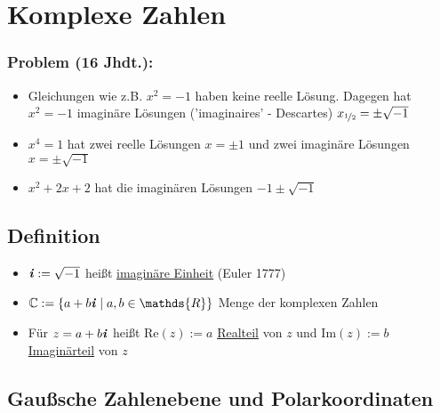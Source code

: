 \documentclass[12pt,titlepage, pdf]{article}
\newcommand{\R}{\mathds{R}}
\newcommand{\uline}[1]{\underline{#1}}
\renewcommand{\Re}[1]{\text{Re}(#1)}
\renewcommand{\Im}[1]{\text{Im}(#1)}
\renewcommand{\i}{\textbf{\textit{i}}}
\renewcommand{\>}{\rightarrow}
\renewcommand{\*}{\cdot}
\begin{document}
\section{Komplexe Zahlen}
\label{5}
\subsubsection*{Problem (16 Jhdt.):} 
\begin{itemize}
	\item Gleichungen wie z.B. $x^2 = -1$ haben keine reelle Lösung. Dagegen hat\\ $x^2 = -1$ imaginäre Lösungen ('imaginaires' - Descartes) $x_{\nicefrac{1}{2}} = \pm \sqrt{-1}$
	\item $x^4 = 1$ hat zwei reelle Lösungen $x = \pm 1$ und zwei imaginäre Lösungen $x = \pm \sqrt{-1}$
	\item $x^2 + 2x +2$ hat die imaginären Lösungen $-1 \pm \sqrt{-1}$
\end{itemize}
\subsection{Definition}
\begin{itemize}
	\item $\i  := \sqrt{-1}$ heißt \uline{imaginäre Einheit} (Euler 1777)
	\item $\mathbb{C} := \{a +b\i \mid a,b \in \R \}$ Menge der komplexen Zahlen
	\item Für $z = a +b\i$ heißt $\Re{z} :=a$ \uline{Realteil} von $z$ und $\Im{z} := b$ \uline{Imaginärteil} von $z$
\end{itemize}
\subsection*{Gaußsche Zahlenebene und Polarkoordinaten}
\end{document}
